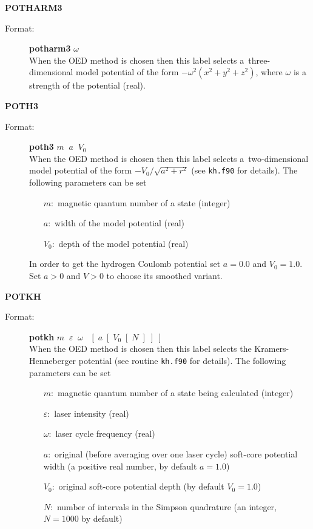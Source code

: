\documentclass[12pt,a4paper]{article}
\newcommand{\ft}[1]{\texttt{#1}}
\begin{document}
\begin{description}
\item \textbf{POTHARM3}
\begin{description}
\item[Format:] \textbf{potharm3} $\omega$ \\ When the OED method is chosen then this label
  selects a~three-dimensional model potential of the form $-\omega^2(x^2+y^2+z^2)$, where
  $\omega$ is a strength of the potential (real).
\end{description}



\item \textbf{POTH3}
\begin{description}
\item[Format:] \textbf{poth3} $m\;\;a\;\;V_0$ \\ When the OED method
  is chosen then this label selects a~two-dimensional model potential
  of the form $ -V_0/\sqrt{a^2+r^2}$ (see \ft{kh.f90} for
  details). The following parameters can be set

\begin{itemize}
\item [$m:$] magnetic quantum number of a state (integer)
\item [$a:$] width of the model potential (real)
\item [$V_0:$] depth of the model potential (real)
\end{itemize}
In order to get the hydrogen Coulomb potential set $a=0.0$ and
$V_0=1.0$. Set $a>0$ and $V>0$ to choose its smoothed variant.

\end{description}


\item \textbf{POTKH}
\begin{description}
\item[Format:] \textbf{potkh}
  $m\;\;\varepsilon\;\;\omega\;\;\;[\;a\;[\;V_0\;[\;N\;]\;]\;]$
  \\ When the OED method is chosen then this label selects the
  Kramers-Henneberger potential (see routine \ft{kh.f90} for
  details). The following parameters can be set
\begin{itemize}
\item [$m:$] magnetic quantum number of a state being calculated (integer)
\item [$\varepsilon:$] laser intensity (real)
\item [$\omega:$] laser cycle frequency (real)
\item [$a:$] original (before averaging over one laser cycle)
  soft-core potential width (a positive real number, by default $a=1.0$)
\item [$V_0:$] original soft-core potential depth (by default $V_0=1.0$)
\item [$N:$] number of intervals in the Simpson quadrature (an
  integer, $N=1000$ by default)
\end{itemize}
\end{description}


\end{description}
\end{document}
